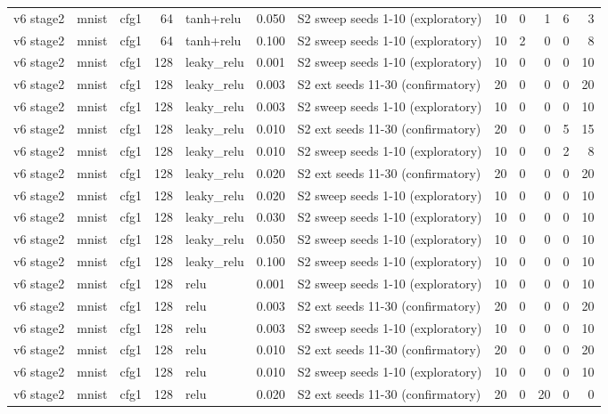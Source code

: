 \begin{table}[htbp]
{\begin{tabular}{@{}lllrlrlrrrrr@{}}
v6 stage2 & mnist & cfg1 & 64 & tanh+relu & 0.050 & S2 sweep seeds 1-10 (exploratory) & 10 & 0 & 1 & 6 & 3 \\
v6 stage2 & mnist & cfg1 & 64 & tanh+relu & 0.100 & S2 sweep seeds 1-10 (exploratory) & 10 & 2 & 0 & 0 & 8 \\
v6 stage2 & mnist & cfg1 & 128 & leaky\_relu & 0.001 & S2 sweep seeds 1-10 (exploratory) & 10 & 0 & 0 & 0 & 10 \\
v6 stage2 & mnist & cfg1 & 128 & leaky\_relu & 0.003 & S2 ext seeds 11-30 (confirmatory) & 20 & 0 & 0 & 0 & 20 \\
v6 stage2 & mnist & cfg1 & 128 & leaky\_relu & 0.003 & S2 sweep seeds 1-10 (exploratory) & 10 & 0 & 0 & 0 & 10 \\
v6 stage2 & mnist & cfg1 & 128 & leaky\_relu & 0.010 & S2 ext seeds 11-30 (confirmatory) & 20 & 0 & 0 & 5 & 15 \\
v6 stage2 & mnist & cfg1 & 128 & leaky\_relu & 0.010 & S2 sweep seeds 1-10 (exploratory) & 10 & 0 & 0 & 2 & 8 \\
v6 stage2 & mnist & cfg1 & 128 & leaky\_relu & 0.020 & S2 ext seeds 11-30 (confirmatory) & 20 & 0 & 0 & 0 & 20 \\
v6 stage2 & mnist & cfg1 & 128 & leaky\_relu & 0.020 & S2 sweep seeds 1-10 (exploratory) & 10 & 0 & 0 & 0 & 10 \\
v6 stage2 & mnist & cfg1 & 128 & leaky\_relu & 0.030 & S2 sweep seeds 1-10 (exploratory) & 10 & 0 & 0 & 0 & 10 \\
v6 stage2 & mnist & cfg1 & 128 & leaky\_relu & 0.050 & S2 sweep seeds 1-10 (exploratory) & 10 & 0 & 0 & 0 & 10 \\
v6 stage2 & mnist & cfg1 & 128 & leaky\_relu & 0.100 & S2 sweep seeds 1-10 (exploratory) & 10 & 0 & 0 & 0 & 10 \\
v6 stage2 & mnist & cfg1 & 128 & relu & 0.001 & S2 sweep seeds 1-10 (exploratory) & 10 & 0 & 0 & 0 & 10 \\
v6 stage2 & mnist & cfg1 & 128 & relu & 0.003 & S2 ext seeds 11-30 (confirmatory) & 20 & 0 & 0 & 0 & 20 \\
v6 stage2 & mnist & cfg1 & 128 & relu & 0.003 & S2 sweep seeds 1-10 (exploratory) & 10 & 0 & 0 & 0 & 10 \\
v6 stage2 & mnist & cfg1 & 128 & relu & 0.010 & S2 ext seeds 11-30 (confirmatory) & 20 & 0 & 0 & 0 & 20 \\
v6 stage2 & mnist & cfg1 & 128 & relu & 0.010 & S2 sweep seeds 1-10 (exploratory) & 10 & 0 & 0 & 0 & 10 \\
v6 stage2 & mnist & cfg1 & 128 & relu & 0.020 & S2 ext seeds 11-30 (confirmatory) & 20 & 0 & 20 & 0 & 0 \\

\end{tabular}}
\end{table}
